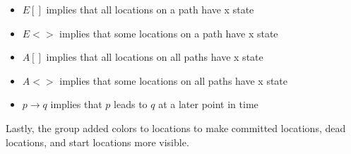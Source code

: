 \begin{itemize}
    \item $E[]$ implies that all locations on a path have x state
    \item $E<>$ implies that some locations on a path have x state
    \item $A[]$ implies that all locations on all paths have x state
    \item $A<>$ implies that some locations on all paths have x state
    \item $p\rightarrow q$ implies that $p$ leads to $q$ at a later point in time
\end{itemize}

Lastly, the group added colors to locations to make committed locations, dead locations, and start locations more visible.
\cite{uppaal}
